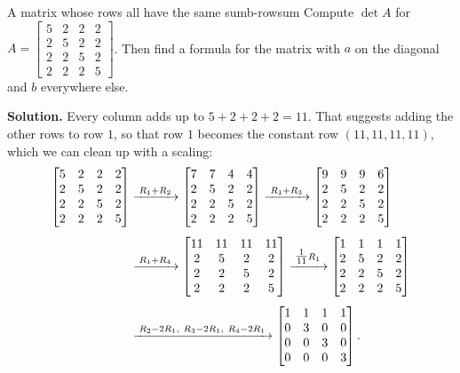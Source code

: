 \documentclass[11pt]{article}
\begin{document}
\begin{exmp}{A matrix whose rows all have the same sum}{b-rowsum}
Compute $\det A$ for $A=\begin{bmatrix}5&2&2&2\\2&5&2&2\\2&2&5&2\\2&2&2&5\end{bmatrix}$. Then find a formula for the matrix with $a$ on the diagonal and $b$ everywhere else.

\textbf{Solution.} Every column adds up to $5+2+2+2=11$. That suggests adding the other rows to row $1$, so that row $1$ becomes the constant row $(11,11,11,11)$, which we can clean up with a scaling:
\begin{align*}
\begin{bmatrix}5&2&2&2\\2&5&2&2\\2&2&5&2\\2&2&2&5\end{bmatrix}
&\xrightarrow{\;R_1+R_2\;}
\begin{bmatrix}7&7&4&4\\2&5&2&2\\2&2&5&2\\2&2&2&5\end{bmatrix}
\xrightarrow{\;R_1+R_3\;}
\begin{bmatrix}9&9&9&6\\2&5&2&2\\2&2&5&2\\2&2&2&5\end{bmatrix}
\\[4pt]
&\xrightarrow{\;R_1+R_4\;}
\begin{bmatrix}11&11&11&11\\2&5&2&2\\2&2&5&2\\2&2&2&5\end{bmatrix}
\xrightarrow{\;\tfrac{1}{11}R_1\;}
\begin{bmatrix}1&1&1&1\\2&5&2&2\\2&2&5&2\\2&2&2&5\end{bmatrix}
\\[4pt]
&\xrightarrow{\;R_2-2R_1,\ R_3-2R_1,\ R_4-2R_1\;}
\begin{bmatrix}1&1&1&1\\0&3&0&0\\0&0&3&0\\0&0&0&3\end{bmatrix}
.
\end{align*}

\end{exmp}
\end{document}
